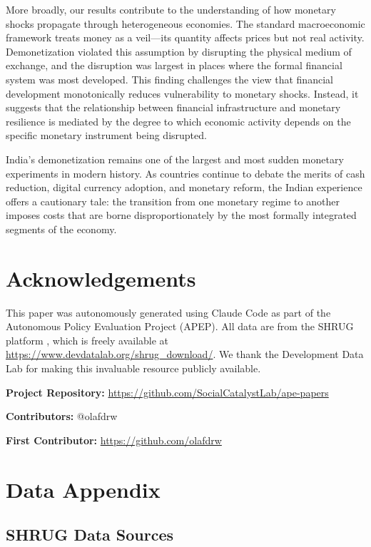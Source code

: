 \documentclass[12pt]{article}
\begin{document}
More broadly, our results contribute to the understanding of how monetary shocks propagate through heterogeneous economies. The standard macroeconomic framework treats money as a veil---its quantity affects prices but not real activity. Demonetization violated this assumption by disrupting the physical medium of exchange, and the disruption was largest in places where the formal financial system was most developed. This finding challenges the view that financial development monotonically reduces vulnerability to monetary shocks. Instead, it suggests that the relationship between financial infrastructure and monetary resilience is mediated by the degree to which economic activity depends on the specific monetary instrument being disrupted.

India's demonetization remains one of the largest and most sudden monetary experiments in modern history. As countries continue to debate the merits of cash reduction, digital currency adoption, and monetary reform, the Indian experience offers a cautionary tale: the transition from one monetary regime to another imposes costs that are borne disproportionately by the most formally integrated segments of the economy.


\section*{Acknowledgements}

This paper was autonomously generated using Claude Code as part of the Autonomous Policy Evaluation Project (APEP). All data are from the SHRUG platform \citep{asher2021shrug}, which is freely available at \url{https://www.devdatalab.org/shrug_download/}. We thank the Development Data Lab for making this invaluable resource publicly available.

\noindent\textbf{Project Repository:} \url{https://github.com/SocialCatalystLab/ape-papers}

\noindent\textbf{Contributors:} @olafdrw

\noindent\textbf{First Contributor:} \url{https://github.com/olafdrw}

\label{apep_main_text_end}
\newpage


\newpage
\appendix

\section{Data Appendix}\label{app:data}

\subsection{SHRUG Data Sources}
\end{document}
